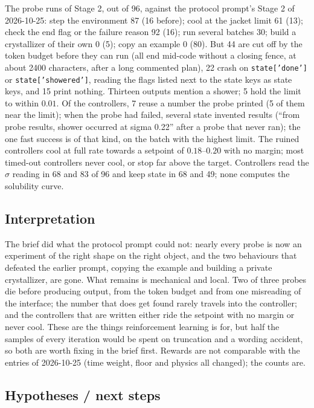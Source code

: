 \documentclass[11pt,a4paper]{article}
\begin{document}
The probe runs of Stage 2, out of 96, against the protocol prompt's Stage 2
of 2026-10-25: step the environment 87 (16 before); cool at the jacket limit
61 (13); check the end flag or the failure reason 92 (16); run several
batches 30; build a crystallizer of their own 0 (5); copy an example 0 (80).
But 44 are cut off by the token budget before they can run (all end mid-code
without a closing fence, at about 2400 characters, after a long commented
plan), 22 crash on \texttt{state['done']} or \texttt{state['showered']},
reading the flags listed next to the state keys as state keys, and 15 print
nothing. Thirteen outputs mention a shower; 5 hold the limit to within
$0.01$. Of the controllers, 7 reuse a number the probe printed (5 of them
near the limit); when the probe had failed, several state invented results
(``from probe results, shower occurred at sigma 0.22'' after a probe that
never ran); the one fast success is of that kind, on the batch with the
highest limit. The ruined controllers cool at full rate towards a setpoint
of $0.18$--$0.20$ with no margin; most timed-out controllers never cool, or
stop far above the target. Controllers read the $\sigma$ reading in 68 and
83 of 96 and keep state in 68 and 49; none computes the solubility curve.

\subsection*{Interpretation}

The brief did what the protocol prompt could not: nearly every probe is now
an experiment of the right shape on the right object, and the two
behaviours that defeated the earlier prompt, copying the example and
building a private crystallizer, are gone. What remains is mechanical and
local. Two of three probes die before producing output, from the token
budget and from one misreading of the interface; the number that does get
found rarely travels into the controller; and the controllers that are
written either ride the setpoint with no margin or never cool. These are
the things reinforcement learning is for, but half the samples of every
iteration would be spent on truncation and a wording accident, so both are
worth fixing in the brief first. Rewards are not comparable with the
entries of 2026-10-25 (time weight, floor and physics all changed); the
counts are.

\subsection*{Hypotheses / next steps}
\end{document}
